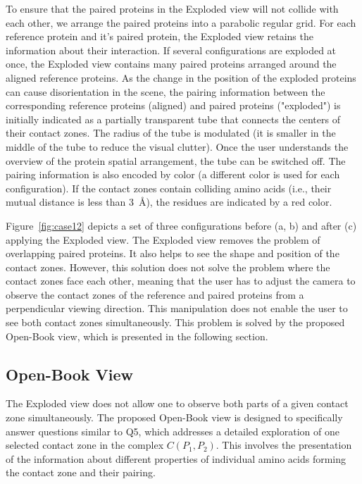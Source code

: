 \documentclass{bmcart}
\def\OpBook {Open-Book view\xspace}
\def\ExpView {Exploded view\xspace}
\begin{document}
To ensure that the paired proteins in the Exploded view will not collide with each other, we arrange the paired proteins into a parabolic regular grid.
For each reference protein and it's paired protein, the \ExpView retains the information about their interaction.
If several configurations are exploded at once, the \ExpView contains many paired proteins arranged around the aligned reference proteins.
As the change in the position of the exploded proteins can cause disorientation in the scene, the pairing information between the corresponding reference proteins (aligned) and paired proteins ("exploded") is initially indicated as a partially transparent tube that connects the centers of their contact zones.
The radius of the tube is modulated (it is smaller in the middle of the tube to reduce the visual clutter).
Once the user understands the overview of the protein spatial arrangement, the tube can be switched off.
The pairing information is also encoded by color (a different color is used for each configuration).
If the contact zones contain colliding amino acids (i.e., their mutual distance is less than 3~\AA), the residues are indicated by a red color.

Figure~\ref{fig:case12} depicts a set of three configurations before (a, b) and after (c) applying the \ExpView.
The Exploded view removes the problem of overlapping paired proteins.
It also helps to see the shape and position of the contact zones.
However, this solution does not solve the problem where the contact zones face each other, meaning that the user has to adjust the camera to observe the contact zones of the reference and paired proteins from a perpendicular viewing direction. 
This manipulation does not enable the user to see both contact zones simultaneously.
This problem is solved by the proposed \OpBook, which is presented in the following section.



\subsection*{Open-Book View}
The \ExpView does not allow one to observe both parts of a given contact zone simultaneously.
The proposed \OpBook is designed to specifically answer questions similar to Q5, which addresses a detailed exploration of one selected contact zone in the complex $C(P_1,P_2)$.
This involves the presentation of the information about different properties of individual amino acids forming the contact zone and their pairing.
\end{document}
